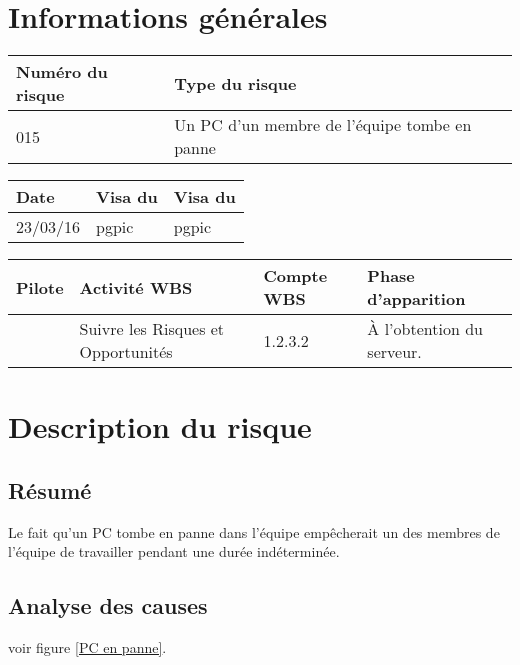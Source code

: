 
\section*{Informations générales}

\begin{table}[H]
\centering
	\begin{tabularx}{16.8cm}{|X|X|}
	\hline
	\rowcolor{gray!40} Numéro du risque & Type du risque \\
	\hline
	015 & Un PC d’un membre de l’équipe tombe en panne \\
	\hline
	\end{tabularx}
\end{table}

\begin{table}[H]
\centering
	\begin{tabularx}{16.8cm}{|X|X|X|}
	\hline
	\rowcolor{gray!40} Date & Visa du \RQ & Visa du \CP \\
	\hline
	 23/03/16 & pgpic & pgpic \\
	\hline
	\end{tabularx}
\end{table}

\begin{table}[H]
\centering
	\begin{tabularx}{16.8cm}{|X|X|X|X|}
	\hline
	\rowcolor{gray!40} Pilote & Activité WBS & Compte WBS & Phase d'apparition \\
	\hline
	 \Sergi & Suivre les Risques et Opportunités & 1.2.3.2 & À l'obtention du serveur. \\
	\hline
	\end{tabularx}
\end{table}

\section*{Description du risque}

\subsection*{Résumé}
	Le fait qu'un PC tombe en panne dans l'équipe empêcherait un des membres de l'équipe de travailler pendant une durée indéterminée.
	
\subsection*{Analyse des causes}
	voir figure \ref{PC en panne}.

